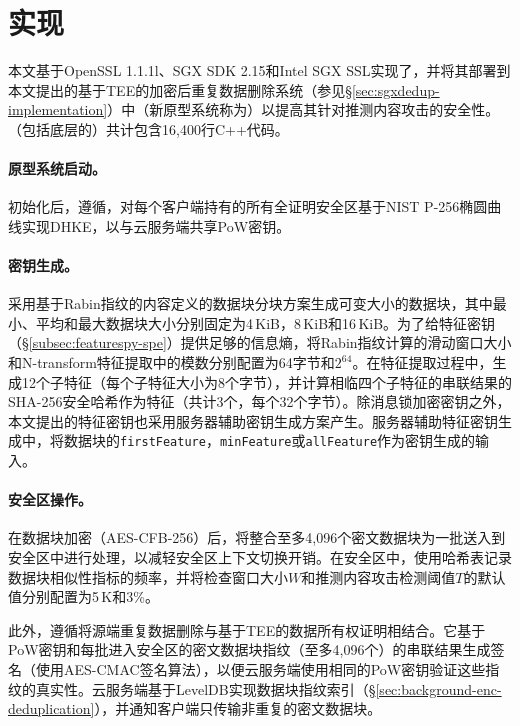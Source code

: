 \section{\prototype 实现}
\label{sec:featurespy-implementation}
本文基于OpenSSL 1.1.1l\cite{openssl}、SGX SDK 2.15\cite{sgxsdk}和Intel SGX SSL\cite{sgxssl}实现了\sysnameF，并将其部署到本文提出的基于TEE的加密后重复数据删除系统\sysnameS （参见\S\ref{sec:sgxdedup-implementation}）中（新原型系统称为\prototype）以提高其针对推测内容攻击的安全性。\prototype（包括底层的\sysnameS ）共计包含16,400行C++代码。

\paragraph*{原型系统启动。}
初始化后，\prototype 遵循\sysnameS，对每个客户端持有的所有全证明安全区基于NIST P-256椭圆曲线\cite{nist}实现DHKE，以与云服务端共享PoW密钥。

\paragraph*{密钥生成。}
\prototype 采用基于Rabin指纹\cite{rabin81}的内容定义的数据块分块方案生成可变大小的数据块，其中最小、平均和最大数据块大小分别固定为4\,KiB，8\,KiB和16\,KiB。为了给特征密钥（\S\ref{subsec:featurespy-spe}）提供足够的信息熵，将Rabin指纹计算的滑动窗口大小和N-transform特征提取中的模数分别配置为64字节和$2^{64}$。在特征提取过程中，生成12个子特征（每个子特征大小为8个字节），并计算相临四个子特征的串联结果的SHA-256安全哈希作为特征（共计3个，每个32个字节）。除消息锁加密密钥之外，本文提出的特征密钥也采用服务器辅助密钥生成方案产生。服务器辅助特征密钥生成中，将数据块的{\tt firstFeature}，{\tt minFeature}或{\tt allFeature}作为密钥生成的输入。

\paragraph*{安全区操作。}
在数据块加密（AES-CFB-256）后，\prototype 将整合至多4,096个密文数据块为一批送入到安全区中进行处理，以减轻安全区上下文切换开销\cite{arnautov2016SCONE}。在安全区中，\prototype 使用哈希表记录数据块相似性指标的频率，并将检查窗口大小$W$和推测内容攻击检测阈值$T$的默认值分别配置为5\,K和3\%。

此外，\prototype 遵循\sysnameS 将源端重复数据删除与基于TEE的数据所有权证明相结合。它基于PoW密钥和每批进入安全区的密文数据块指纹（至多4,096个）的串联结果生成签名（使用AES-CMAC签名算法），以便云服务端使用相同的PoW密钥验证这些指纹的真实性。云服务端基于LevelDB\cite{leveldb}实现数据块指纹索引（\S\ref{sec:background-enc-deduplication}），并通知客户端只传输非重复的密文数据块。

